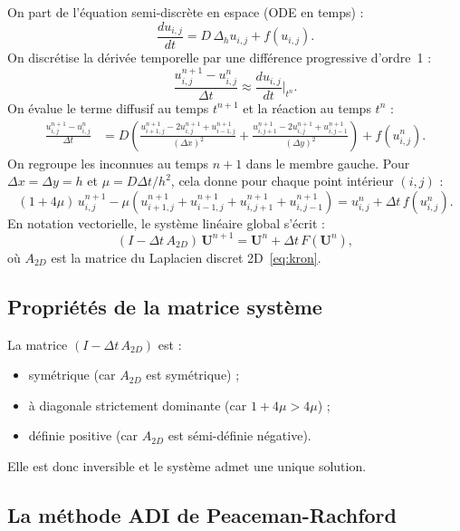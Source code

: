\documentclass[11pt,a4paper]{report}
\begin{document}
On part de l'\'equation semi-discr\`ete en espace (ODE en temps) :
\begin{equation}
  \frac{d u_{i,j}}{dt} = D\,\Delta_h u_{i,j} + f(u_{i,j}).
\end{equation}
On discr\'etise la d\'eriv\'ee temporelle par une diff\'erence progressive d'ordre~1 :
\begin{equation}
  \frac{u_{i,j}^{n+1} - u_{i,j}^n}{\Delta t} \approx \frac{du_{i,j}}{dt}\bigg|_{t^n}.
\end{equation}
On \'evalue le terme diffusif au temps $t^{n+1}$ et la r\'eaction au temps $t^n$ :
\begin{align}
  \frac{u_{i,j}^{n+1} - u_{i,j}^n}{\Delta t}
  &= D\!\left(\frac{u_{i+1,j}^{n+1}-2u_{i,j}^{n+1}+u_{i-1,j}^{n+1}}{(\Delta x)^2}
             +\frac{u_{i,j+1}^{n+1}-2u_{i,j}^{n+1}+u_{i,j-1}^{n+1}}{(\Delta y)^2}\right)
  + f(u_{i,j}^n).
\end{align}
On regroupe les inconnues au temps $n+1$ dans le membre gauche. Pour $\Delta x=\Delta y=h$
et $\mu=D\Delta t/h^2$, cela donne pour chaque point int\'erieur $(i,j)$ :
\begin{equation}
  (1+4\mu)\,u_{i,j}^{n+1}
  -\mu(u_{i+1,j}^{n+1}+u_{i-1,j}^{n+1}+u_{i,j+1}^{n+1}+u_{i,j-1}^{n+1})
  = u_{i,j}^n + \Delta t\,f(u_{i,j}^n).
\end{equation}
En notation vectorielle, le syst\`eme lin\'eaire global s'\'ecrit :
\begin{equation}
  \boxed{(I - \Delta t\,A_{2D})\,\mathbf{U}^{n+1} = \mathbf{U}^n + \Delta t\,F(\mathbf{U}^n),}
\end{equation}
o\`u $A_{2D}$ est la matrice du Laplacien discret 2D~\eqref{eq:kron}.

\subsection*{Propri\'et\'es de la matrice syst\`eme}

La matrice $(I-\Delta t\,A_{2D})$ est :
\begin{itemize}[leftmargin=1.5em]
  \item sym\'etrique (car $A_{2D}$ est sym\'etrique) ;
  \item \`a diagonale strictement dominante (car $1+4\mu > 4\mu$) ;
  \item d\'efinie positive (car $A_{2D}$ est s\'emi-d\'efinie n\'egative).
\end{itemize}
Elle est donc inversible et le syst\`eme admet une unique solution.

\subsection*{La m\'ethode ADI de Peaceman-Rachford}
\end{document}
